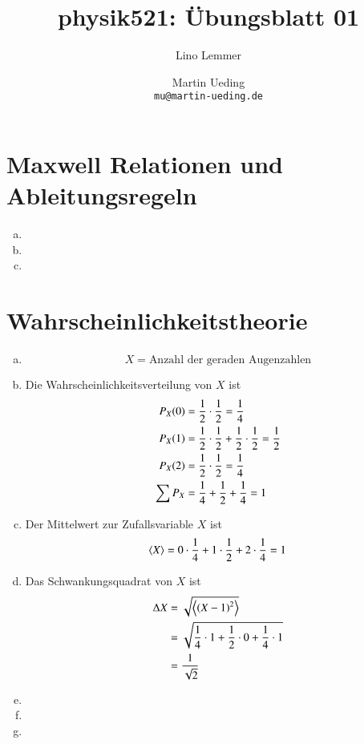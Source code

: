 

\setcounter{section}{1}
\renewcommand\thesection{H\,1.\arabic{section}}

\title{physik521: Übungsblatt 01}
\author{Lino Lemmer \and Martin Ueding \\ \small{\texttt{mu@martin-ueding.de}}}


\maketitle
\section{Maxwell Relationen und Ableitungsregeln}

\begin{enumerate}[(a)]
    \item
    \item
    \item
\end{enumerate}

\section{Wahrscheinlichkeitstheorie}

\begin{enumerate}[(a)]
    \item
        \[
            X = \text{Anzahl der geraden Augenzahlen}
        \]
    \item
        Die Wahrscheinlichkeitsverteilung von $X$ ist
        \begin{align*}
            P_X(0) &= \frac 12\cdot\frac 12 = \frac 14\\
            P_X(1) &= \frac 12\cdot\frac 12 + \frac 12\cdot\frac 12 = \frac 12\\
            P_X(2) &= \frac 12\cdot\frac 12 = \frac 14\\
            \sum P_X &= \frac 14 + \frac 12 + \frac 14 = 1
        \end{align*}
    \item
        Der Mittelwert zur Zufallsvariable $X$ ist
        \[
            \left\langle X\right\rangle = 0\cdot\frac14 + 1\cdot\frac 12 + 2\cdot\frac14 = 1
        \]
    \item
        Das Schwankungsquadrat von $X$ ist
        \begin{align*}
            \Delta X &= \sqrt{\mw{\del{X - 1}^2}}\\
                       &= \sqrt{\frac 14 \cdot 1 + \half \cdot 0 + \frac 14 \cdot 1}\\
                       &= \frac1{\sqrt{2}}
        \end{align*}
    \item
    \item
    \item
\end{enumerate}

